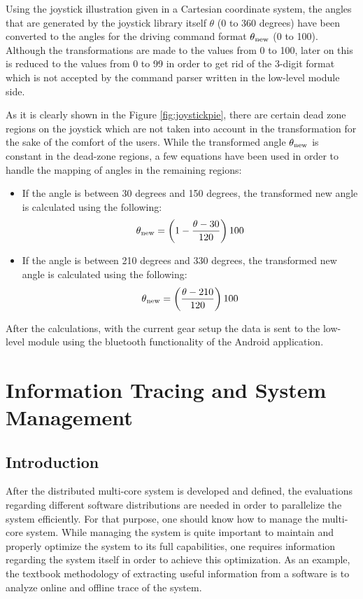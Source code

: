 Using the joystick illustration given in a Cartesian coordinate system, the angles that are generated by the joystick library itself $\theta$ (0 to 360 degrees) have been converted to the angles for the driving command format $\theta\textsubscript{new}$ (0 to 100). Although the transformations are made to the values from 0 to 100, later on this is reduced to the values from 0 to 99 in order to get rid of the 3-digit format which is not accepted by the command parser written in the low-level module side.

As it is clearly shown in the Figure \ref{fig:joystickpie}, there are certain dead zone regions on the joystick which are not taken into account in the transformation for the sake of the comfort of the users. While the transformed angle $\theta\textsubscript{new}$ is  constant in the dead-zone regions, a few equations have been used in order to handle the mapping of angles in the remaining regions:
\begin{itemize}
	\item If the angle is between 30 degrees and 150 degrees, the transformed new angle is calculated using the following:
	\begin{equation}
	\theta\textsubscript{new}=\left(1 - \frac{\theta - 30}{120}\right) 100
	\end{equation}
	\item If the angle is between 210 degrees and 330 degrees, the transformed new angle is calculated using the following:
	\begin{equation}
	\theta\textsubscript{new}=\left(\frac{\theta - 210}{120}\right) 100
	\end{equation} 
\end{itemize}
After the calculations, with the current gear setup the data is sent to the low-level module using the bluetooth functionality of the Android application.


\chapter{Information Tracing and System Management} \label{informationchapter}
\section{Introduction}
After the distributed multi-core system is developed and defined, the evaluations regarding different software distributions are needed in order to parallelize the system efficiently. For that purpose, one should know how to manage the multi-core system. While managing the system is quite important to maintain and properly optimize the system to its full capabilities, one requires information regarding the system itself in order to achieve this optimization. As an example, the textbook methodology of extracting useful information from a software is to analyze online and offline trace of the system. 

